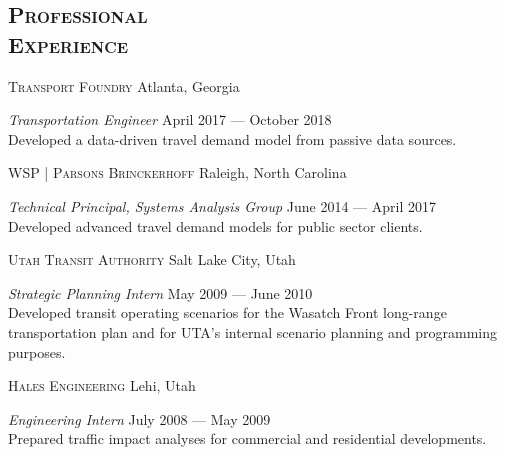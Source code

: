 \documentclass[margin,line]{res}
\newcommand{\secfont}{\scshape }
\newcommand{\acc}{\scshape }
\begin{document}
\begin{resume}
\noindent\makebox[\linewidth]{\rule{\linewidth}{0.4pt}}

\section{\secfont Professional \\ Experience}


{\acc Transport Foundry} Atlanta, Georgia

\vspace{-.3cm}
\textit{Transportation Engineer} \hfill {April 2017 --- October 2018}\\
Developed a data-driven travel demand model from passive data sources.

{\acc WSP | Parsons Brinckerhoff} Raleigh, North Carolina

\vspace{-.3cm}
\textit{Technical Principal, Systems Analysis Group} \hfill {June 2014 --- April 2017}\\
Developed advanced travel demand models for public sector clients.



{\acc Utah Transit Authority} Salt Lake City, Utah

\vspace{-.3cm}
\textit{Strategic Planning Intern} \hfill {May 2009 --- June 2010}\\
Developed transit operating scenarios for the Wasatch Front long-range
transportation plan and for UTA's internal scenario planning and programming purposes.

{\acc Hales Engineering} Lehi, Utah

\vspace{-.3cm}
\textit{Engineering Intern} \hfill {July 2008 --- May 2009}\\
Prepared traffic impact analyses for commercial and residential developments.





\end{resume}
\end{document}
